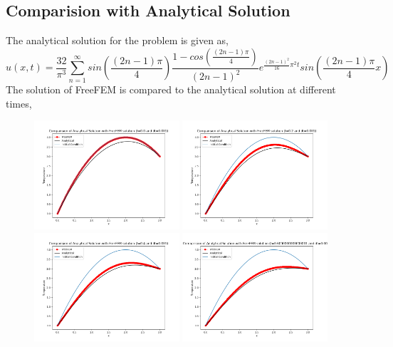 \documentclass[11pt]{article} %
\begin{document}
\subsection{Comparision with Analytical Solution}
The analytical solution for the problem is given as,
\begin{equation}
u(x,t) = \frac{32}{\pi^3}\sum_{n=1}^{\infty}sin\left(\frac{(2n - 1)\pi}{4}\right)\frac{1 - cos\left(\frac{(2n - 1)\pi}{4}\right)}{(2n - 1)^2}e^{\frac{(2n-1)^2}{16}\pi^2 t}sin\left(\frac{(2n - 1)\pi}{4} x\right)
\end{equation}
 The solution of FreeFEM is compared to the analytical solution at different times,
\begin{figure}[H]
\centering
\includegraphics[width=0.48\textwidth]{figures/p320.png}
\includegraphics[width=0.48\textwidth]{figures/p321.png}
\includegraphics[width=0.48\textwidth]{figures/p322.png}
\includegraphics[width=0.48\textwidth]{figures/p323.png}

\end{figure}
\end{document}
